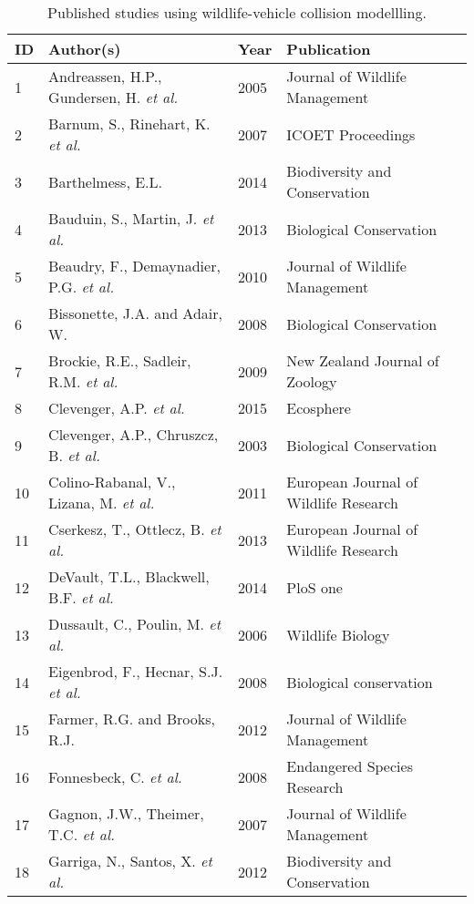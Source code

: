 \begin{longtable}[c]{@{}p{.75cm}p{6cm}p{1.25cm}p{5.5cm}@{}}
\caption[Published studies using wildlife-vehicle collision modellling.]{Published studies using wildlife-vehicle collision modellling.}
\label{coll_studies}\\
\toprule
ID & Author(s) & Year & Publication \\ 
  \hline
  \endhead
    1 & Andreassen, H.P., Gundersen, H. \textit{et al.} & 2005 & Journal of Wildlife Management \\ 
    2 & Barnum, S., Rinehart, K. \textit{et al.} & 2007 & ICOET Proceedings \\ 
    3 & Barthelmess, E.L. & 2014 & Biodiversity and Conservation \\ 
    4 & Bauduin, S., Martin, J. \textit{et al.} & 2013 & Biological Conservation  \\ 
    5 & Beaudry, F., Demaynadier, P.G. \textit{et al.} & 2010 & Journal of Wildlife Management \\ 
    6 & Bissonette, J.A. and Adair, W. & 2008 & Biological Conservation \\ 
    7 & Brockie, R.E., Sadleir, R.M. \textit{et al.} & 2009 & New Zealand Journal of Zoology \\ 
    8 & Clevenger, A.P. \textit{et al.} & 2015 & Ecosphere \\ 
    9 & Clevenger, A.P., Chruszcz, B. \textit{et al.} & 2003 & Biological Conservation  \\ 
   10 & Colino-Rabanal, V., Lizana, M. \textit{et al.} & 2011 & European Journal of Wildlife Research \\ 
   11 & Cserkesz, T., Ottlecz, B. \textit{et al.} & 2013 & European Journal of Wildlife Research \\ 
   12 & DeVault, T.L., Blackwell, B.F. \textit{et al.} & 2014 & PloS one \\ 
   13 & Dussault, C., Poulin, M. \textit{et al.} & 2006 & Wildlife Biology \\ 
   14 & Eigenbrod, F., Hecnar, S.J. \textit{et al.} & 2008 & Biological conservation \\ 
   15 & Farmer, R.G. and Brooks, R.J. & 2012 & Journal of Wildlife Management \\ 
   16 & Fonnesbeck, C. \textit{et al.} & 2008 & Endangered Species Research \\ 
   17 & Gagnon, J.W., Theimer, T.C. \textit{et al.} & 2007 & Journal of Wildlife Management \\ 
   18 & Garriga, N., Santos, X. \textit{et al.} & 2012 & Biodiversity and Conservation \\ 

\end{longtable}
